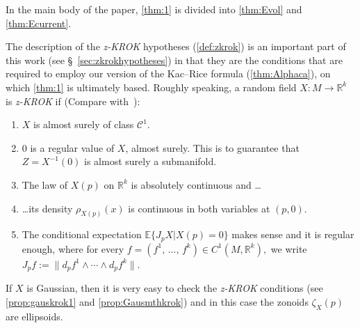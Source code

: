 \documentclass[AHL, Unicode, longabstracts, published]{cedram}
\newcommand{\R}{\mathbb{R}}
\newcommand{\EE}{\mathbb{E}}
\newcommand{\mC}{\mathcal{C}}
\newcommand{\zkrok}{\emph{z-KROK}\xspace}
\begin{document}
In the main body of the paper, \cref{thm:1} is divided into \cref{thm:Evol} and \cref{thm:Ecurrent}.

The description of the {\zkrok} hypotheses (\cref{def:zkrok}) is an important part of this work (see \S~\ref{sec:zkrokhypotheses}) in that they are the conditions that are required to employ our version of the Kac--Rice formula (\cref{thm:Alphaca}), on which \cref{thm:1} is ultimately based. Roughly speaking, a random field $X\colon M\to \R^k$ is \zkrok if (Compare with~\cite[2.1]{KRStec}):
\begin{enumerate}
\item $X$ is almost surely of class $\mC^1$.
\item $0$ is a regular value of $X$, almost surely. This is to guarantee that $Z=X^{-1}(0)$ is almost surely a submanifold.
\item The law of $X(p)$ on $\R^k$ is absolutely continuous and \dots
\item \dots its density $\rho_{X(p)}(x)$ is continuous in both variables at $(p,0)$.
\item The conditional expectation $\EE\{J_pX|X(p)=0\}$ makes sense and it is regular enough, where for every $f=(f^1,\,\ldots,\,f^k)\in C^1(M,\R^k),$ we write $J_pf:=\|d_pf^1\wedge\cdots\wedge d_pf^k\|$.
\end{enumerate}
If $X$ is Gaussian, then it is very easy to check the \zkrok conditions (see \cref{prop:gauskrok1} and \cref{prop:Gausmthkrok}) and in this case the zonoids $\zeta_X(p)$ are ellipsoids.
\end{document}

